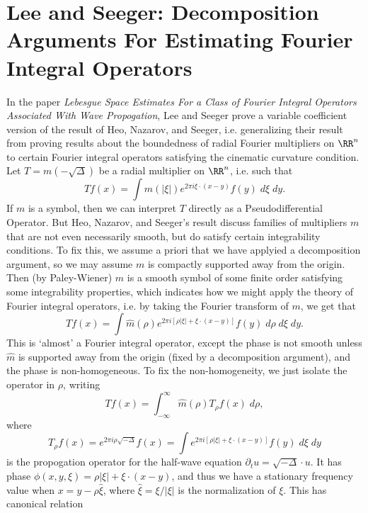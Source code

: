 \chapter{Lee and Seeger: Decomposition Arguments For Estimating Fourier Integral Operators}

In the paper \emph{Lebesgue Space Estimates For a Class of Fourier Integral Operators Associated With Wave Propogation}, Lee and Seeger prove a variable coefficient version of the result of Heo, Nazarov, and Seeger, i.e. generalizing their result from proving results about the boundedness of radial Fourier multipliers on $\RR^n$ to certain Fourier integral operators satisfying the cinematic curvature condition. Let $T = m(-\sqrt{\Delta})$ be a radial multiplier on $\RR^n$, i.e. such that
%
\[ T f(x) = \int m(|\xi|) e^{2 \pi i \xi \cdot (x - y)} f(y)\; d\xi\; dy. \]
%
If $m$ is a symbol, then we can interpret $T$ directly as a Pseudodifferential Operator. But Heo, Nazarov, and Seeger's result discuss families of multipliers $m$ that are not even necessarily smooth, but do satisfy certain integrability conditions. To fix this, we assume a priori that we have applyied a decomposition argument, so we may assume $m$ is compactly supported away from the origin. Then (by Paley-Wiener) $\widehat{m}$ is a smooth symbol of some finite order satisfying some integrability properties, which indicates how we might apply the theory of Fourier integral operators, i.e. by taking the Fourier transform of $m$, we get that
%
\[ Tf(x) = \int \widehat{m}(\rho) e^{2 \pi i [\rho |\xi| + \xi \cdot (x-y)]} f(y)\; d\rho\; d\xi\; dy. \]
%
This is `almost' a Fourier integral operator, except the phase is not smooth unless $\widehat{m}$ is supported away from the origin (fixed by a decomposition argument), and the phase is non-homogeneous. To fix the non-homogeneity, we just isolate the operator in $\rho$, writing
%
\[ Tf(x) = \int_{-\infty}^\infty \widehat{m}(\rho) T_\rho f(x)\; d\rho, \]
%
where
%
\[ T_\rho f(x) = e^{2 \pi i \rho \sqrt{-\Delta}} f(x) = \int e^{2 \pi i [\rho |\xi| + \xi \cdot (x - y)]} f(y)\; d\xi\; dy \]
%
is the propogation operator for the half-wave equation $\partial_t u = \sqrt{-\Delta} \cdot u$. It has phase $\phi(x,y,\xi) = \rho |\xi| + \xi \cdot (x - y)$, and thus we have a stationary frequency value when $x = y - \rho \widehat{\xi}$, where $\widehat{\xi} = \xi / |\xi|$ is the normalization of $\xi$. This has canonical relation





